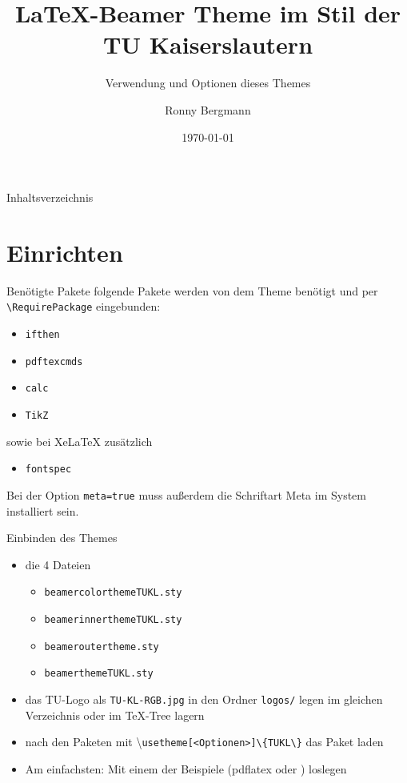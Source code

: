 \documentclass[german,10pt,xcolor=colortbl,compress
]{beamer}
\title{\LaTeX-Beamer Theme im Stil der TU Kaiserslautern}
\subtitle{Verwendung und Optionen dieses Themes}
\date[]{\today}
\author[R. Bergmann]{Ronny Bergmann}
\institute[]{AG Bildverarbeitung\\FB Mathematik\\TU Kaiserslautern}
\begin{document}
	\maketitle
	\begin{frame}{Inhaltsverzeichnis}
		\tableofcontents
	\end{frame}
	\section{Einrichten}
	\begin{frame}[fragile]{Benötigte Pakete}
		folgende Pakete werden von dem Theme benötigt und per \lstinline!\RequirePackage! eingebunden:
		\begin{itemize}
			\item \lstinline!ifthen!
			\item \lstinline!pdftexcmds!
			\item \lstinline!calc!
			\item \lstinline!TikZ!
		\end{itemize}\vspace{\baselineskip}
		sowie bei XeLaTeX zusätzlich
		\begin{itemize}
			\item \lstinline!fontspec!
		\end{itemize}\vspace{\baselineskip}
		Bei der Option \lstinline!meta=true! muss außerdem die Schriftart Meta im System installiert sein.
	\end{frame}
	\begin{frame}{Einbinden des Themes}
		\begin{itemize}
			\item die 4 Dateien
			\begin{itemize}
				\item \lstinline|beamercolorthemeTUKL.sty|
				\item \lstinline|beamerinnerthemeTUKL.sty|
				\item \lstinline!beameroutertheme.sty!
				\item \lstinline|beamerthemeTUKL.sty| 
			\end{itemize}
			\item das TU-Logo als \lstinline!TU-KL-RGB.jpg! in den Ordner \lstinline!logos/! legen
			 im gleichen Verzeichnis oder im \TeX-Tree lagern
			\item nach den Paketen mit \textbackslash\lstinline|usetheme[<Optionen>]\{TUKL\}| das Paket laden
			\item Am einfachsten: Mit einem der Beispiele (pdflatex oder \XeLaTeX) loslegen
		\end{itemize}
	\end{frame}
\end{document}
